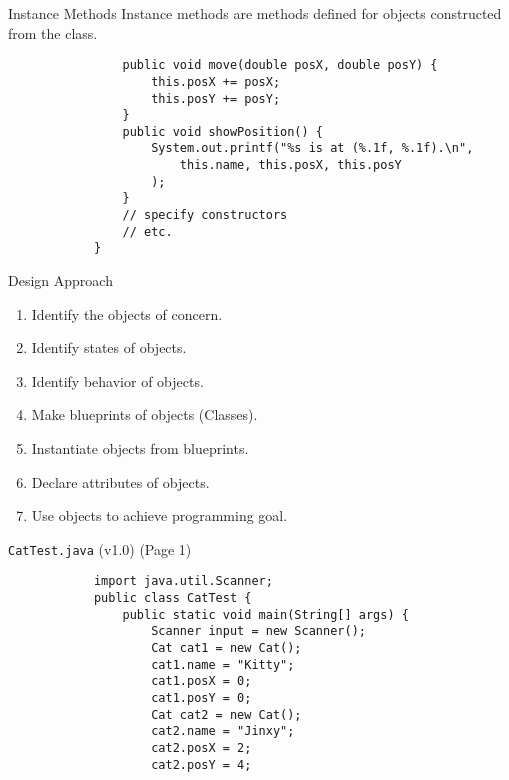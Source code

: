 \documentclass[10pt, compress]{beamer}
\begin{document}
\begin{slide}
	\begin{block}{Instance Methods}
		Instance methods are methods defined for objects constructed from the class.
		\begin{verbatim}
			    public void move(double posX, double posY) {
			        this.posX += posX;
			        this.posY += posY;
			    }
			    public void showPosition() {
			        System.out.printf("%s is at (%.1f, %.1f).\n",
			            this.name, this.posX, this.posY
			        );
			    }
			    // specify constructors
			    // etc.
			}
		\end{verbatim}
	\end{block}
\end{slide}

\begin{slide}
	\begin{block}{Design Approach}
		\begin{enumerate}
			\item[] Identify the objects of concern.
			\item[] Identify states of objects.
			\item[] Identify behavior of objects.
			\item[] Make blueprints of objects (Classes).
			\item[] Instantiate objects from blueprints.
			\item[] Declare attributes of objects.
			\item[] Use objects to achieve programming goal.
		\end{enumerate}
	\end{block}
\end{slide}

\begin{slide}
	\begin{block}{\texttt{CatTest.java} (v1.0) (Page 1)}
		\begin{verbatim}
			import java.util.Scanner;
			public class CatTest {
			    public static void main(String[] args) {
			        Scanner input = new Scanner();
			        Cat cat1 = new Cat();
			        cat1.name = "Kitty";
			        cat1.posX = 0;
			        cat1.posY = 0;
			        Cat cat2 = new Cat();
			        cat2.name = "Jinxy";
			        cat2.posX = 2;
			        cat2.posY = 4;
		\end{verbatim}
	\end{block}
\end{slide}
\end{document}
